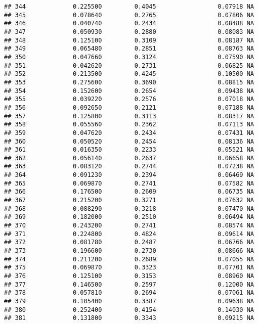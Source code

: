 \documentclass[
]{article}
\begin{document}
\begin{verbatim}
## 344             0.225500         0.4045                 0.07918 NA
## 345             0.078640         0.2765                 0.07806 NA
## 346             0.040740         0.2434                 0.08488 NA
## 347             0.050930         0.2880                 0.08083 NA
## 348             0.125100         0.3109                 0.08187 NA
## 349             0.065480         0.2851                 0.08763 NA
## 350             0.047660         0.3124                 0.07590 NA
## 351             0.042620         0.2731                 0.06825 NA
## 352             0.213500         0.4245                 0.10500 NA
## 353             0.275600         0.3690                 0.08815 NA
## 354             0.152600         0.2654                 0.09438 NA
## 355             0.039220         0.2576                 0.07018 NA
## 356             0.092650         0.2121                 0.07188 NA
## 357             0.125800         0.3113                 0.08317 NA
## 358             0.055560         0.2362                 0.07113 NA
## 359             0.047620         0.2434                 0.07431 NA
## 360             0.050520         0.2454                 0.08136 NA
## 361             0.016350         0.2233                 0.05521 NA
## 362             0.056140         0.2637                 0.06658 NA
## 363             0.083120         0.2744                 0.07238 NA
## 364             0.091230         0.2394                 0.06469 NA
## 365             0.069870         0.2741                 0.07582 NA
## 366             0.176500         0.2609                 0.06735 NA
## 367             0.215200         0.3271                 0.07632 NA
## 368             0.088290         0.3218                 0.07470 NA
## 369             0.182000         0.2510                 0.06494 NA
## 370             0.243200         0.2741                 0.08574 NA
## 371             0.224800         0.4824                 0.09614 NA
## 372             0.081780         0.2487                 0.06766 NA
## 373             0.196600         0.2730                 0.08666 NA
## 374             0.211200         0.2689                 0.07055 NA
## 375             0.069870         0.3323                 0.07701 NA
## 376             0.125100         0.3153                 0.08960 NA
## 377             0.146500         0.2597                 0.12000 NA
## 378             0.057810         0.2694                 0.07061 NA
## 379             0.105400         0.3387                 0.09638 NA
## 380             0.252400         0.4154                 0.14030 NA
## 381             0.131800         0.3343                 0.09215 NA

\end{verbatim}
\end{document}
